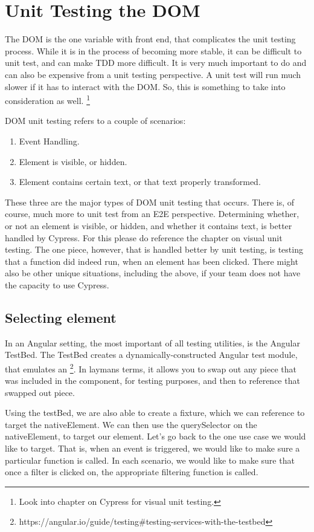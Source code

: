 
\chapter{ Unit Testing the DOM }
The DOM is the one variable with front end, that complicates the unit testing
process. While it is in the process of becoming more stable, it can be difficult
to unit test, and can make TDD more difficult. It is very much important to do
and can also be expensive from a unit testing perspective. A unit test will
run much slower if it has to interact with the DOM. So, this is something to
take into consideration as well. \footnote{Look into chapter on Cypress for
visual unit testing.}

DOM unit testing refers to a couple of scenarios:
\begin{enumerate}
  \item Event Handling.
  \item Element is visible, or hidden.
  \item Element contains certain text, or that text properly transformed.
\end{enumerate}

These three are the major types of DOM unit testing that occurs. There is, of
course, much more to unit test from an E2E perspective. Determining whether, or
not an element is visible, or hidden, and whether it contains text, is better
handled by Cypress. For this please do reference the chapter on visual unit
testing. The one piece, however, that is handled better by unit testing, is
testing that a function did indeed run, when an element has been clicked. There
might also be other unique situations, including the above, if your team does
not have the capacity to use Cypress.

\section{ Selecting element }
In an Angular setting, the most important of all testing utilities, is the
Angular TestBed. The TestBed creates a dynamically-constructed Angular test
module, that emulates an \@NgModule \footnote{https://angular.io/guide/testing\#testing-services-with-the-testbed}. In laymans terms, it allows you to swap out any
piece that was included in the component, for testing purposes, and then to
reference that swapped out piece.

Using the testBed, we are also able to create a fixture, which we can reference
to target the nativeElement. We can then use the querySelector on the
nativeElement, to target our element. Let's go back to the one use case we
would like to target. That is, when an event is triggered, we would like to
make sure a particular function is called. In each scenario, we would like to
make sure that once a filter is clicked on, the appropriate filtering function
is called.

